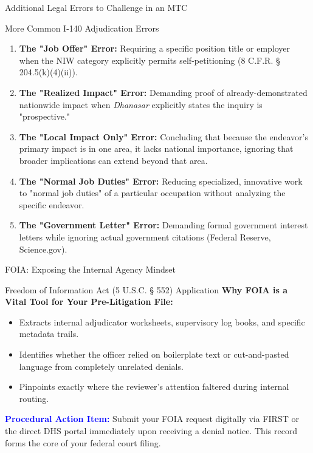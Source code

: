 \documentclass[11pt]{beamer}
\begin{document}
	\begin{frame}{Additional Legal Errors to Challenge in an MTC}
		\scriptsize
		\begin{block}{More Common I-140 Adjudication Errors}
			\begin{enumerate}
				\item \textbf{The "Job Offer" Error:} Requiring a specific position title or employer when the NIW category explicitly permits self-petitioning (8 C.F.R. § 204.5(k)(4)(ii)).
				\item \textbf{The "Realized Impact" Error:} Demanding proof of already-demonstrated nationwide impact when \textit{Dhanasar} explicitly states the inquiry is "prospective."
				\item \textbf{The "Local Impact Only" Error:} Concluding that because the endeavor's primary impact is in one area, it lacks national importance, ignoring that broader implications can extend beyond that area.
				\item \textbf{The "Normal Job Duties" Error:} Reducing specialized, innovative work to "normal job duties" of a particular occupation without analyzing the specific endeavor.
				\item \textbf{The "Government Letter" Error:} Demanding formal government interest letters while ignoring actual government citations (Federal Reserve, Science.gov).
			\end{enumerate}
		\end{block}
	\end{frame}
	
	
	\begin{frame}{FOIA: Exposing the Internal Agency Mindset}
		\scriptsize
		\begin{block}{Freedom of Information Act (5 U.S.C. § 552) Application}
			\textbf{Why FOIA is a Vital Tool for Your Pre-Litigation File:}
			\begin{itemize}
				\item Extracts internal adjudicator worksheets, supervisory log books, and specific metadata trails.
				\item Identifies whether the officer relied on boilerplate text or cut-and-pasted language from completely unrelated denials.
				\item Pinpoints exactly where the reviewer's attention faltered during internal routing.
			\end{itemize}
			\textcolor{blue}{\textbf{Procedural Action Item:}} Submit your FOIA request digitally via FIRST or the direct DHS portal immediately upon receiving a denial notice. This record forms the core of your federal court filing.
		\end{block}
	\end{frame}
	
\end{document}
